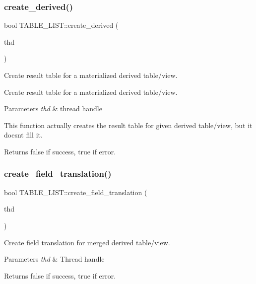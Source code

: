 \subsubsection{\texorpdfstring{create\+\_\+derived()}{create\_derived()}}
{\footnotesize\ttfamily bool T\+A\+B\+L\+E\+\_\+\+L\+I\+S\+T\+::create\+\_\+derived (\begin{DoxyParamCaption}\item[{T\+HD $\ast$}]{thd }\end{DoxyParamCaption})}



Create result table for a materialized derived table/view. 

Create result table for a materialized derived table/view.


\begin{DoxyParams}{Parameters}
{\em thd} & thread handle\\
\hline
\end{DoxyParams}
This function actually creates the result table for given \textquotesingle{}derived\textquotesingle{} table/view, but it doesn\textquotesingle{}t fill it.

\begin{DoxyReturn}{Returns}
false if success, true if error. 
\end{DoxyReturn}
\mbox{\label{structTABLE__LIST_a906a0b504dfa959bbed67ed05c40f51b}} 
\subsubsection{\texorpdfstring{create\+\_\+field\+\_\+translation()}{create\_field\_translation()}}
{\footnotesize\ttfamily bool T\+A\+B\+L\+E\+\_\+\+L\+I\+S\+T\+::create\+\_\+field\+\_\+translation (\begin{DoxyParamCaption}\item[{T\+HD $\ast$}]{thd }\end{DoxyParamCaption})}

Create field translation for merged derived table/view.


\begin{DoxyParams}{Parameters}
{\em thd} & Thread handle\\
\hline
\end{DoxyParams}
\begin{DoxyReturn}{Returns}
false if success, true if error. 
\end{DoxyReturn}
\mbox{\label{structTABLE__LIST_a8ff5480f49562c213faf73c3a7f0dc15}} 
